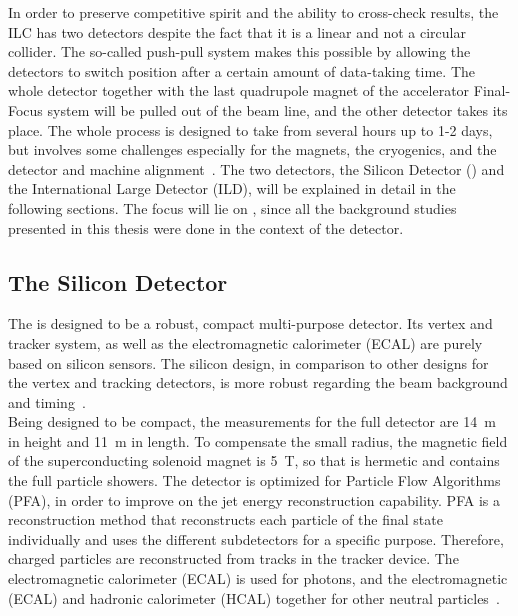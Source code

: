 In order to preserve competitive spirit and the ability to cross-check results, the ILC has two detectors despite the fact that it is a linear and not a circular collider.
The so-called push-pull system makes this possible by allowing the detectors to switch position after a certain amount of data-taking time.
The whole detector together with the last quadrupole magnet of the accelerator Final-Focus system will be pulled out of the beam line, and the other detector takes its place.
The whole process is designed to take from several hours up to 1-2 days, but involves some challenges especially for the magnets, the cryogenics, and the detector and machine alignment~\cite[p. 28-29]{TDR1}.
The two detectors, the Silicon Detector (\sid) and the International Large Detector (ILD), will be explained in detail in the following sections.
The focus will lie on \sid, since all the background studies presented in this thesis were done in the context of the \sid detector.

\subsection{The Silicon Detector}
\label{ILC:SiD}
The \sid is designed to be a robust, compact multi-purpose detector.
Its vertex and tracker system, as well as the electromagnetic calorimeter (ECAL) are purely based on silicon sensors.
The silicon design, in comparison to other designs for the vertex and tracking detectors, is more robust regarding the beam background and timing~\cite[cf. p. 57ff]{TDR4}.
\\Being designed to be compact, the measurements for the full detector are \SI{14}{m} in height and \SI{11}{m} in length.
To compensate the small radius, the magnetic field of the superconducting solenoid magnet is \SI{5}{T}, so that \sid is hermetic and contains the full particle showers.
The detector is optimized for Particle Flow Algorithms (PFA), in order to improve on the jet energy reconstruction capability.
PFA is a reconstruction method that reconstructs each particle of the final state individually and uses the different subdetectors for a specific purpose.
Therefore, charged particles are reconstructed from tracks in the tracker device.
The electromagnetic calorimeter (ECAL) is used for photons, and the electromagnetic (ECAL) and hadronic calorimeter (HCAL) together for other neutral particles~\cite{PFA}.

